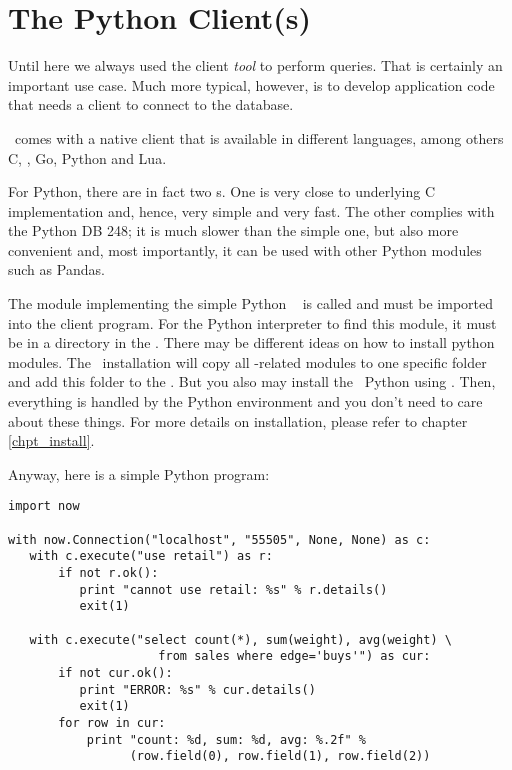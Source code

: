 
\section{The Python Client(s)}
Until here we always used the client \emph{tool}
to perform queries.
That is certainly an important use case.
Much more typical, however, is to develop application code
that needs a client  to connect to the database.

\nowdb\ comes with a native client 
that is available in different languages, among others
C, \CC, Go, Python and Lua.

For Python, there are in fact
two s. One is very close to underlying
C implementation and, hence, very simple and very fast.
The other complies with the Python DB 
 248; it is much slower than the simple
one, but also more convenient and, most importantly,
it can be used with other Python modules such as Pandas.

The module implementing the simple Python \nowdb\ 
is called  and must be imported into the client program.
For the Python interpreter to find this module,
it must be in a directory in the .
There may be different ideas on how to install python modules.
The \nowdb\ installation will copy all \nowdb-related modules
to one specific folder and add this folder to the
. But you also may install
the \nowdb\ Python  using .
Then, everything is handled by the Python environment
and you don't need to care about these things.
For more details on installation, please refer
to chapter \ref{chpt_install}.

Anyway, here is a simple Python program:

\begin{python}
\begin{lstlisting}
import now

with now.Connection("localhost", "55505", None, None) as c:
   with c.execute("use retail") as r:
       if not r.ok():
          print "cannot use retail: %s" % r.details()
          exit(1)

   with c.execute("select count(*), sum(weight), avg(weight) \
                     from sales where edge='buys'") as cur:
       if not cur.ok():
          print "ERROR: %s" % cur.details()
          exit(1)
       for row in cur:
           print "count: %d, sum: %d, avg: %.2f" %
                 (row.field(0), row.field(1), row.field(2))
\end{lstlisting}
\end{python}


